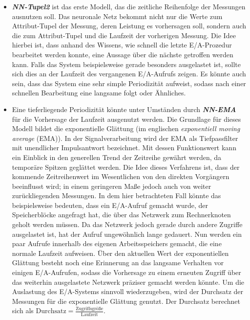 \documentclass[
	12pt,
	a4paper,
	BCOR10mm,
	DIV14,
	listof=totoc,
	bibliography=totoc,
	headsepline
]{scrreprt}
\begin{document}
\begin{itemize}
	\item \textit{\textbf{NN-Tupel2}} ist das erste Modell, das die zeitliche Reihenfolge der Messungen ausnutzen soll. Das neuronale Netz bekommt nicht nur die Werte zum Attribut-Tupel der Messung, deren Leistung es vorhersagen soll, sondern auch die zum Attribut-Tupel und die Laufzeit der vorherigen Messung.
	Die Idee hierbei ist, dass anhand des Wissens, wie schnell die letzte E/A-Prozedur bearbeitet werden konnte, eine Aussage über die nächste getroffen werden kann. Falls das System beispielsweise gerade besonders ausgelastet ist, sollte sich dies an der Laufzeit des vergangenen E/A-Aufrufs zeigen.
	Es könnte auch sein, dass das System eine sehr simple Periodizität aufweist, sodass nach einer schnellen Bearbeitung eine langsame folgt oder Ähnliches.
	\item Eine tieferliegende Periodizität könnte unter Umständen durch \textit{\textbf{NN-EMA}} für die Vorhersage der Laufzeit ausgenutzt werden. Die Grundlage für dieses Modell bildet die exponentielle Glättung (im englischen \textit{exponentiell moving average} (EMA)). In der Signalverarbeitung wird der EMA als Tiefpassfilter mit unendlicher Impulsantwort bezeichnet.
	Mit dessen Funktionswert kann ein Einblick in den generellen Trend der Zeitreihe gewährt werden, da temporäre Spitzen geglättet werden.
	Die Idee dieses Verfahrens ist, dass der kommende Zeitreihenwert im Wesentlichen von den direkten Vorgängern beeinflusst wird; in einem geringeren Maße jedoch auch von weiter zurückliegenden Messungen.
	In dem hier betrachteten Fall könnte das beispielsweise bedeuten, dass ein E/A-Aufruf gemacht wurde, der Speicherblöcke angefragt hat, die über das Netzwerk zum Rechnerknoten geholt werden müssen. Da das Netzwerk jedoch gerade durch andere Zugriffe ausgelastet ist, hat der Aufruf ungewöhnlich lange gedauert. Nun werden ein paar Aufrufe innerhalb des eigenen Arbeitsspeichers gemacht, die eine normale Laufzeit aufweisen. Über den aktuellen Wert der exponentiellen Glättung besteht noch eine Erinnerung an das langsame Verhalten vor einigen E/A-Aufrufen, sodass die Vorhersage zu einem erneuten Zugriff über das weiterhin ausgelastete Netzwerk präziser gemacht werden könnte.
	Um die Auslastung des E/A-Systems sinnvoll wiederzugeben, wird der Durchsatz der Messungen für die exponentielle Glättung genutzt. Der Durchsatz berechnet sich als $\mbox{Durchsatz} =  \frac{\mbox{Zugriffsgröße}}{\mbox{Laufzeit}}$.
	

\end{itemize}
\end{document}
